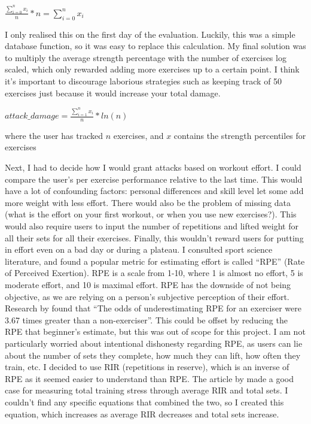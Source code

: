 \documentclass{l4proj}
\begin{document}
\begin{algorithm}[H]
  $\frac{\sum_{i=0}^{n} x_i}{n} * n = {\sum_{i=0}^{n} x_i}$
\end{algorithm}

I only realised this on the first day of the evaluation. Luckily, this was a simple database function, so it was easy to replace this calculation. 
My final solution was to multiply the average strength percentage with the number of exercises log scaled, which only rewarded adding more exercises up to a certain point. I think it's important to discourage laborious strategies such as keeping track of 50 exercises just because it would increase your total damage. 

\begin{algorithm}
  $attack\_damage = \frac{\sum_{i=1}^{n} x_i}{n} * ln(n) $

  where the user has tracked $n$ exercises, and $x$ contains the strength percentiles for exercises 
\end{algorithm}

Next, I had to decide how I would grant attacks based on workout effort. I could compare the user's per exercise performance relative to the last time. This would have a lot of confounding factors: personal differences and skill level let some add more weight with less effort. There would also be the problem of missing data (what is the effort on your first workout, or when you use new exercises?). This would also require users to input the number of repetitions and lifted weight for all their sets for all their exercises. Finally, this wouldn't reward users for putting in effort even on a bad day or during a plateau. I consulted sport science literature, and found a popular metric for estimating effort is called ``RPE'' (Rate of Perceived Exertion). RPE is a scale from 1-10, where 1 is almost no effort, 5 is moderate effort, and 10 is maximal effort. RPE has the downside of not being objective, as we are relying on a person's subjective perception of their effort. Research by \citet{RPE_estimations} found that ``The odds of underestimating RPE for an exerciser were 3.67 times greater than a non-exerciser''. This could be offset by reducing the RPE that beginner's estimate, but this was out of scope for this project. I am not particularly worried about intentional dishonesty regarding RPE, as users can lie about the number of sets they complete, how much they can lift, how often they train, etc. I decided to use RIR (repetitions in reserve), which is an inverse of RPE as it seemed easier to understand than RPE. The article by \citet{rir} made a good case for measuring total training stress through average RIR and total sets. I couldn't find any specific equations that combined the two, so I created this equation, which increases as average RIR decreases and total sets increase.
\end{document}

